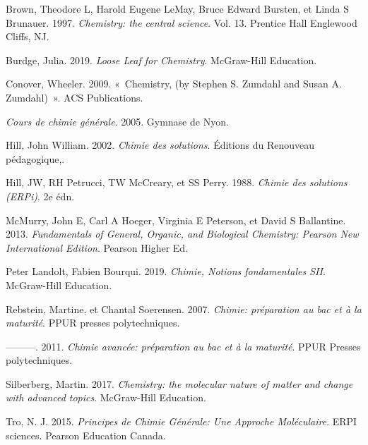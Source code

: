 \documentclass[
  11pt,
  a4paper,
  openany]{book}
\newlength{\cslhangindent}
\newenvironment{CSLReferences}[2] %
 {\begin{list}{}{%
  \setlength{\itemindent}{0pt}
  \setlength{\leftmargin}{0pt}
  \setlength{\parsep}{0pt}
  \ifodd #1
   \setlength{\leftmargin}{\cslhangindent}
   \setlength{\itemindent}{-1\cslhangindent}
  \fi
  \setlength{\itemsep}{#2\baselineskip}}}
 {\end{list}}
\begin{document}
\label{refs}
\begin{CSLReferences}{1}{0}
Brown, Theodore L, Harold Eugene LeMay, Bruce Edward Bursten, et Linda S Brunauer. 1997. \emph{Chemistry: the central science}. Vol. 13. Prentice Hall Englewood Cliffs, NJ.

Burdge, Julia. 2019. \emph{Loose Leaf for Chemistry}. McGraw-Hill Education.

Conover, Wheeler. 2009. {«~Chemistry, (by Stephen S. Zumdahl and Susan A. Zumdahl)~»}. ACS Publications.

\emph{Cours de chimie g{é}n{é}rale}. 2005. Gymnase de Nyon.

Hill, John William. 2002. \emph{Chimie des solutions}. {É}ditions du Renouveau p{é}dagogique,.

Hill, JW, RH Petrucci, TW McCreary, et SS Perry. 1988. \emph{Chimie des solutions (ERPi)}. 2e {é}dn.

McMurry, John E, Carl A Hoeger, Virginia E Peterson, et David S Ballantine. 2013. \emph{Fundamentals of General, Organic, and Biological Chemistry: Pearson New International Edition}. Pearson Higher Ed.

Peter Landolt, Fabien Bourqui. 2019. \emph{Chimie, Notions fondamentales SII}. McGraw-Hill Education.

Rebstein, Martine, et Chantal Soerensen. 2007. \emph{Chimie: pr{é}paration au bac et {à} la maturit{é}}. PPUR presses polytechniques.

---------. 2011. \emph{Chimie avanc{é}e: pr{é}paration au bac et {à} la maturit{é}}. PPUR Presses polytechniques.

Silberberg, Martin. 2017. \emph{Chemistry: the molecular nature of matter and change with advanced topics}. McGraw-Hill Education.

Tro, N. J. 2015. \emph{Principes de Chimie G{é}n{é}rale: Une Approche Mol{é}culaire}. ERPI sciences. Pearson Education Canada.

\end{CSLReferences}
\end{document}
